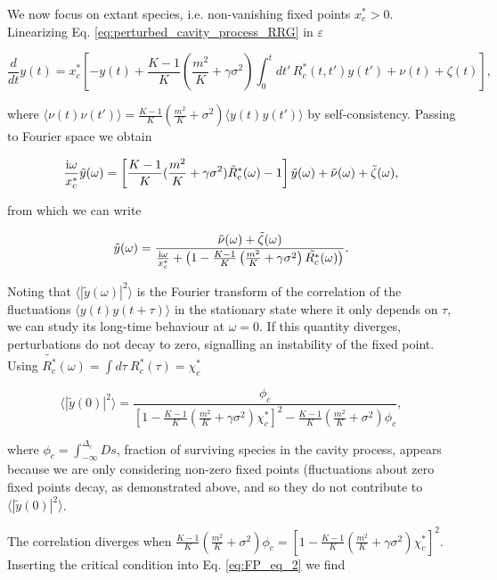 \documentclass[
    preprint,
    linenumbers,
    amsmath,amssymb,amsfonts,
    aps, physrev,
    superscriptaddress,
    10pt,
    bibnotes
    ]{revtex4-2}
\begin{document}
We now focus on extant species, i.e. non-vanishing fixed points $x_{c}^{*}>0$.
Linearizing Eq. \eqref{eq:perturbed_cavity_process_RRG} in $\varepsilon$

\begin{equation}
\frac{d}{dt}y(t)=x_{c}^{*}\left[-y(t)+\frac{K-1}{K}\left(\frac{m^{2}}{K}+\gamma\sigma^{2}\right)\int_{0}^{t}dt'\,R_{c}^{*}(t,t')y(t')+\nu(t)+\zeta(t)\right],
\end{equation}

where $\langle\nu(t)\nu(t')\rangle=\frac{K-1}{K}(\frac{m^{2}}{K}+\sigma^{2})\langle y(t)y(t')\rangle$
by self-consistency. Passing to Fourier space we obtain

\begin{equation}
\frac{{\rm i}\omega}{x_{c}^{*}}\tilde{y}(\omega)=\left[\frac{K-1}{K}(\frac{m^{2}}{K}+\gamma\sigma^{2})\tilde{R}_{c}^{*}(\omega)-1\right]\tilde{y}(\omega)+\tilde{\nu}(\omega)+\tilde{\zeta}(\omega),
\end{equation}

from which we can write

\[
\tilde{y}(\omega)=\frac{\tilde{\nu}(\omega)+\tilde{\zeta}(\omega)}{\frac{{\rm i}\omega}{x_{c}^{*}}+\left(1-\frac{K-1}{K}\left(\frac{m^{2}}{K}+\gamma\sigma^{2}\right)\tilde{R_{c}^{*}}(\omega)\right)}.
\]

Noting that $\langle\left|\tilde{y}(\omega)\right|^{2}\rangle$ is
the Fourier transform of the correlation of the fluctuations $\langle y(t)y(t+\tau)\rangle$
in the stationary state where it only depends on $\tau$, we can study
its long-time behaviour at $\omega=0$. If this quantity diverges,
perturbations do not decay to zero, signalling an instability of the
fixed point. Using $\tilde{R_{c}^{*}}(\omega)=\int d\tau\:R_{c}^{*}(\tau)=\chi_{c}^{*}$

\begin{equation}
\langle\left|\tilde{y}(0)\right|^{2}\rangle=\frac{\phi_{c}}{\left[1-\frac{K-1}{K}\left(\frac{m^{2}}{K}+\gamma\sigma^{2}\right)\chi_{c}^{*}\right]^{2}-\frac{K-1}{K}\left(\frac{m^{2}}{K}+\sigma^{2}\right)\phi_{c}},
\end{equation}

where $\phi_{c}=\int_{-\infty}^{\Delta_{c}}Ds$, fraction of surviving
species in the cavity process, appears because we are only considering
non-zero fixed points (fluctuations about zero fixed points decay,
as demonstrated above, and so they do not contribute to $\langle\left|\tilde{y}(0)\right|^{2}\rangle$. 

The correlation diverges when $\frac{K-1}{K}\left(\frac{m^{2}}{K}+\sigma^{2}\right)\phi_{c}=\left[1-\frac{K-1}{K}\left(\frac{m^{2}}{K}+\gamma\sigma^{2}\right)\chi_{c}^{*}\right]^{2}$.
Inserting the critical condition into Eq. \eqref{eq:FP_eq_2} we find
\end{document}
